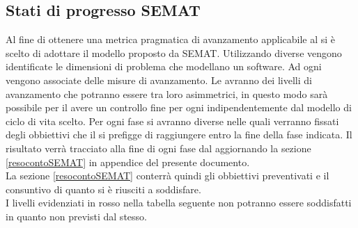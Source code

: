\subsection{Stati di progresso SEMAT}\label{SEMAT}
Al fine di ottenere una metrica pragmatica di avanzamento applicabile al  si è scelto di adottare il modello proposto da SEMAT.
Utilizzando diverse  vengono identificate le dimensioni di problema che modellano un  software.
Ad ogni  vengono associate delle misure di avanzamento.
Le  avranno dei livelli di avanzamento che potranno essere tra loro asimmetrici, in questo modo sarà possibile per il \rRP avere un controllo fine per ogni  indipendentemente dal modello di ciclo di vita scelto.
Per ogni fase si avranno diverse  nelle quali verranno fissati degli obbiettivi che il  si prefigge di raggiungere entro la fine della fase indicata. Il risultato verrà tracciato alla fine di ogni fase dal \rRP aggiornando la sezione \ref{resocontoSEMAT} in appendice del presente documento. \\
La sezione \ref{resocontoSEMAT} conterrà quindi gli obbiettivi preventivati e il consuntivo di quanto si è riusciti a soddisfare. \\
I livelli evidenziati in rosso nella tabella seguente non potranno essere soddisfatti in quanto non previsti dal  stesso.
